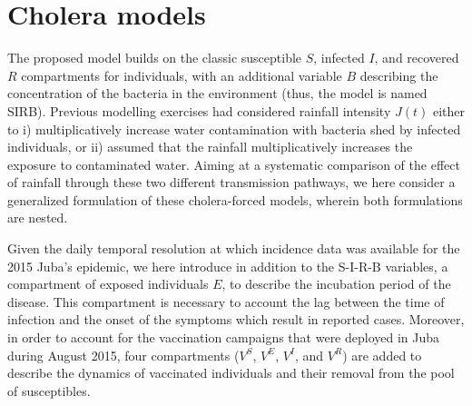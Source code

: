 \section{Cholera models}
\label{sec:meth}
The proposed model builds on the classic susceptible $S$, infected $I$, and recovered $R$ compartments for individuals, with an additional variable $B$ describing the concentration of the bacteria in the environment (thus, the model is named SIRB). Previous modelling exercises had considered rainfall intensity $J(t)$ either to i) multiplicatively increase water contamination with bacteria shed by infected  individuals\cite{Bertuzzo:ProbabilityExtinctionHaiti:2016,Pasetto:RealtimeProjectionsCholera:2017}, or ii) assumed that the rainfall multiplicatively increases the exposure to contaminated water\cite{Eisenberg:ExaminingRainfallCholera:2013}. Aiming at a systematic comparison of the effect of rainfall through these two different transmission pathways, we here consider a generalized formulation of these cholera-forced models, wherein both formulations are nested.

Given the daily temporal resolution at which incidence data was available for the 2015 Juba's epidemic, we here introduce in addition to the S-I-R-B variables, a compartment of exposed individuals $E$, to describe the incubation period of the disease. This compartment is necessary to account the lag between the time of infection and the onset of the symptoms which result in reported cases. Moreover, in order to account for the vaccination campaigns that were deployed in Juba during August 2015, four compartments ($V^S$, $V^E$, $V^I$, and $V^R$) are added to describe the dynamics of vaccinated individuals and their removal from the pool of susceptibles.

